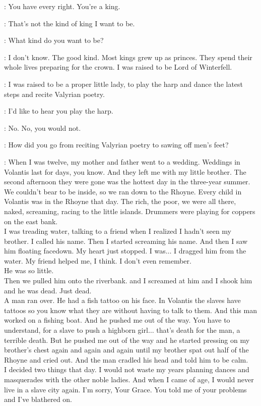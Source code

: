 \TALISA: You have every right. You're a king. 

\ROBB: That's not the kind of king I want to be. 

\TALISA: What kind do you want to be? 

\ROBB: I don't know. The good kind. Most kings grew up as princes. They spend their whole lives preparing for the crown. I was raised to be Lord of Winterfell. 

\TALISA: I was raised to be a proper little lady, to play the harp and dance the latest steps and recite Valyrian poetry. 

\ROBB: I'd like to hear you play the harp. 

\TALISA: No. No, you would not. 

\ROBB: How did you go from reciting Valyrian poetry to sawing off men's feet? 

\TALISA: When I was twelve, my mother and father went to a wedding. Weddings in Volantis last for days, you know. And they left me with my little brother. The second afternoon they were gone was the hottest day in the three-year summer. We couldn't bear to be inside, so we ran down to the Rhoyne. Every child in Volantis was in the Rhoyne that day. The rich, the poor, we were all there, naked, screaming, racing to the little islands. Drummers were playing for coppers on the east bank.\\
I was treading water, talking to a friend when I realized I hadn't seen my brother. I called his name. Then I started screaming his name. And then I saw him floating facedown. My heart just stopped. I was$\ldots$ I dragged him from the water. My friend helped me, I think. I don't even remember.\\
He was so little.\\
Then we pulled him onto the riverbank. and I screamed at him and I shook him and he was dead. Just dead.\\
A man ran over. He had a fish tattoo on his face. In Volantis the slaves have tattoos so you know what they are without having to talk to them. And this man worked on a fishing boat. And he pushed me out of the way. You have to understand, for a slave to push a highborn girl$\ldots$ that's death for the man, a terrible death. But he pushed me out of the way and he started pressing on my brother's chest again and again and again until my brother spat out half of the Rhoyne and cried out. And the man cradled his head and told him to be calm.\\
I decided two things that day. I would not waste my years planning dances and masquerades with the other noble ladies. And when I came of age, I would never live in a slave city again.  I'm sorry, Your Grace. You told me of your problems and I've blathered on. 

